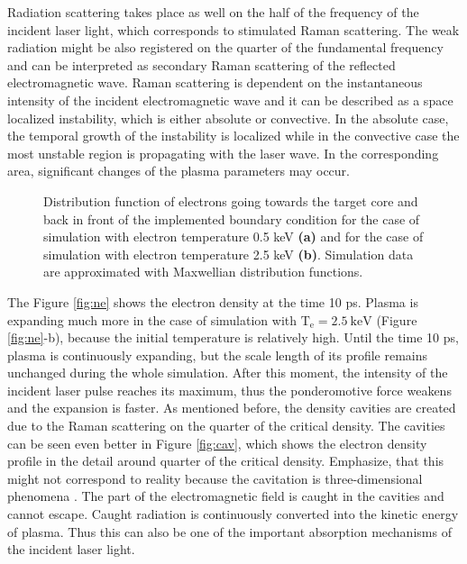 Radiation scattering takes place as well on the half of the frequency of the incident laser light, which corresponds to stimulated Raman scattering. The weak radiation might be also registered on the quarter of the fundamental frequency and can be interpreted as secondary Raman scattering of the reflected electromagnetic wave. Raman scattering is dependent on the instantaneous intensity of the incident electromagnetic wave and it can be described as a space localized instability, which is either absolute or convective. In the absolute case, the temporal growth of the instability is localized while in the convective case the most unstable region is propagating with the laser wave. In the corresponding area, significant changes of the plasma parameters may occur.

\begin{figure}[h!]%
	\centering
	\caption{Distribution function of electrons going towards the target core and back in front of the implemented boundary condition for the case of simulation with electron temperature 0.5 keV \textbf{(a)} and for the case of simulation with electron temperature 2.5 keV \textbf{(b)}. Simulation data are approximated with Maxwellian distribution functions.}%
	\label{fig:distr}%
\end{figure}

The Figure \ref{fig:ne} shows the electron density at the time 10 ps. Plasma is expanding much more in the case of simulation with $ \mathrm{T_e} = 2.5 \: \mathrm{keV} $ (Figure \ref{fig:ne}-b), because the initial temperature is relatively high. Until the time 10 ps, plasma is continuously expanding, but the scale length of its profile remains unchanged during the whole simulation. After this moment, the intensity of the incident laser pulse reaches its maximum, thus the ponderomotive force weakens and the expansion is faster. As mentioned before, the density cavities are created due to the Raman scattering on the quarter of the critical density. The cavities can be seen even better in Figure \ref{fig:cav}, which shows the electron density profile in the detail around quarter of the critical density. Emphasize, that this might not correspond to reality because the cavitation is three-dimensional phenomena \cite{klimo6}. The part of the electromagnetic field is caught in the cavities and cannot escape. Caught radiation is continuously converted into the kinetic energy of plasma. Thus this can also be one of the important absorption mechanisms of the incident laser light.

